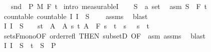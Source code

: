 \begin{isabellebody}
\ \ \ {\isachardoublequoteopen}snd\ {\isasymin}\ {\isasymSigma}\isactrlsub P\ {\isasymrightarrow}\isactrlsub M\ F\ t\isanewline
%
\isadelimproof
%
\endisadelimproof
%
\isatagproof
{}\isamarkupfalse%
\ {\isacharparenleft}{\kern0pt}intro\ measurableI{\isacharparenright}{\kern0pt}\isanewline
\ \ \isamarkupfalse%
\ S\ {\isacharcolon}{\kern0pt}{\isacharcolon}{\kern0pt}\ {\isachardoublequoteopen}{\isacharprime}{\kern0pt}a\ set{\isachardoublequoteclose}\ \isamarkupfalse%
\ asm{\isacharcolon}{\kern0pt}\ {\isachardoublequoteopen}S\ {\isasymin}\ F\ t\isanewline
\ \ \isamarkupfalse%
\ countable{\isacharcolon}{\kern0pt}\ {\isachardoublequoteopen}countable\ {\isacharparenleft}{\kern0pt}{\isacharparenleft}{\kern0pt}{\isasymlambda}I{\isachardot}{\kern0pt}\ I\ {\isasymtimes}\ S{\isacharparenright}{\kern0pt}\ {\isacharbackquote}{\kern0pt}\ {\isasymI}{\isacharparenright}{\kern0pt}{\isachardoublequoteclose}\ \isamarkupfalse%
\ assms{\isacharparenleft}{\kern0pt}{}{\isacharparenright}{\kern0pt}\ \isamarkupfalse%
\ blast\isanewline
\ \ \isamarkupfalse%
\ {\isachardoublequoteopen}{\isacharparenleft}{\kern0pt}{\isasymlambda}I{\isachardot}{\kern0pt}\ I\ {\isasymtimes}\ S{\isacharparenright}{\kern0pt}\ {\isacharbackquote}{\kern0pt}\ {\isasymI}\ {\isasymsubseteq}\ {\isacharbraceleft}{\kern0pt}{\isacharbraceleft}{\kern0pt}s{\isacharless}{\kern0pt}{\isachardot}{\kern0pt}{\isachardot}{\kern0pt}t{\isacharbraceright}{\kern0pt}\ {\isasymtimes}\ A\ {\isacharbar}{\kern0pt}\ A\ s\ t{\isachardot}{\kern0pt}\ A\ {\isasymin}\ F\ s\ {\isasymand}\ t\ {\isasymle}\ s\ {\isasymand}\ \ s\ {\isacharless}{\kern0pt}\ t{\isacharbraceright}{\kern0pt}{\isachardoublequoteclose}\ \isamarkupfalse%
\ sets{\isacharunderscore}{\kern0pt}F{\isacharunderscore}{\kern0pt}mono{\isacharbrackleft}{\kern0pt}OF\ order{\isacharunderscore}{\kern0pt}refl{\isacharcomma}{\kern0pt}\ THEN\ subsetD{\isacharcomma}{\kern0pt}\ OF\ {\isacharunderscore}{\kern0pt}\ asm{\isacharbrackright}{\kern0pt}\ assms{\isacharparenleft}{\kern0pt}{}{\isacharparenright}{\kern0pt}\ \isamarkupfalse%
\ blast\isanewline
\ \ \isamarkupfalse%
\ {\isachardoublequoteopen}{\isacharparenleft}{\kern0pt}{\isasymUnion}I{\isasymin}{\isasymI}{\isachardot}{\kern0pt}\ I\ {\isasymtimes}\ S{\isacharparenright}{\kern0pt}\ {\isasymunion}\ {\isacharbraceleft}{\kern0pt}t\ {\isasymtimes}\ S\ {\isasymin}\ {\isasymSigma}\isactrlsub P{\isachardoublequoteclose}\ \isamarkupfalse%

\end{isabellebody}
